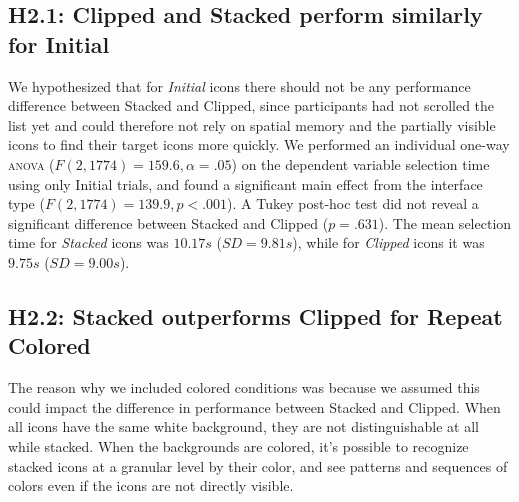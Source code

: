 \documentclass[nobib]{tufte-book} %
\begin{document}
\subsection{H2.1: Clipped and Stacked perform similarly for Initial}
We hypothesized that for \emph{Initial} icons there should not be any performance difference between Stacked and Clipped, since participants had not scrolled the list yet and could therefore not rely on spatial memory and the partially visible icons to find their target icons more quickly. We performed an individual one-way \textsc{anova} ($F(2,1774) = 159.6, \alpha = .05$) on the dependent variable selection time using only Initial trials, and found a significant main effect from the interface type ($F(2,1774) = 139.9, p < .001$).
A Tukey post-hoc test did not reveal a significant difference between Stacked and Clipped ($p = .631$). The mean selection time for \emph{Stacked} icons was $10.17 s$ ($SD = 9.81 s$), while for \emph{Clipped} icons it was $9.75 s$ ($SD = 9.00 s$).

\subsection{H2.2: Stacked outperforms Clipped for Repeat Colored}
The reason why we included colored conditions was because we assumed this could impact the difference in performance between Stacked and Clipped. When all icons have the same white background, they are not distinguishable at all while stacked. When the backgrounds are colored, it's possible to recognize stacked icons at a granular level by their color, and see patterns and sequences of colors even if the icons are not directly visible.
\end{document}
